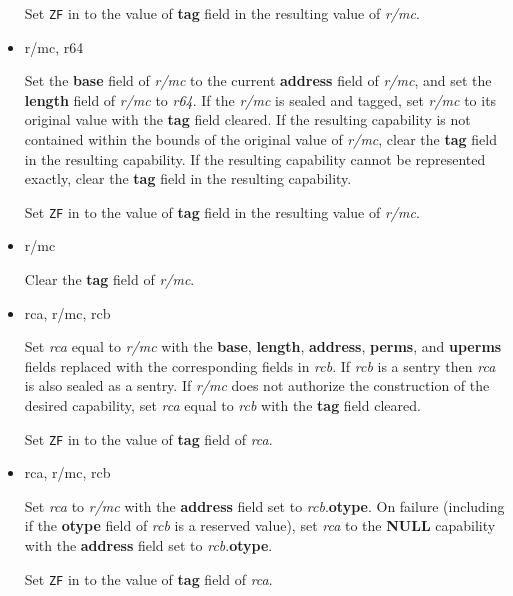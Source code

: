 \begin{itemize}
    Set \texttt{ZF} in \RFLAGS{} to the value of \textbf{tag} field
    in the resulting value of \emph{r/mc}.

  \item {} r/mc, r64

    Set the \textbf{base} field of \emph{r/mc} to the current
    \textbf{address} field of \emph{r/mc}, and set the \textbf{length}
    field of \emph{r/mc} to \emph{r64}.  If the \emph{r/mc} is sealed
    and tagged, set \emph{r/mc} to its original value with the
    \textbf{tag} field cleared.  If the resulting capability is not
    contained within the bounds of the original value of \emph{r/mc},
    clear the \textbf{tag} field in the resulting capability.  If the
    resulting capability cannot be represented exactly, clear the
    \textbf{tag} field in the resulting capability.

    Set \texttt{ZF} in \RFLAGS{} to the value of \textbf{tag} field
    in the resulting value of \emph{r/mc}.

  \item {} r/mc

    Clear the \textbf{tag} field of \emph{r/mc}.

  \item {} rca, r/mc, rcb

    Set \emph{rca} equal to \emph{r/mc} with the \textbf{base},
    \textbf{length}, \textbf{address}, \textbf{perms}, and
    \textbf{uperms} fields replaced with the corresponding fields in
    \emph{rcb}.  If \emph{rcb} is a sentry then \emph{rca} is also
    sealed as a sentry.  If \emph{r/mc} does not authorize the
    construction of the desired capability, set \emph{rca} equal to
    \emph{rcb} with the \textbf{tag} field cleared.

    Set \texttt{ZF} in \RFLAGS{} to the value of \textbf{tag} field
    of \emph{rca}.

  \item {} rca, r/mc, rcb

    Set \emph{rca} to \emph{r/mc} with the \textbf{address} field set
    to \emph{rcb}.\textbf{otype}.  On failure (including if the
    \textbf{otype} field of \emph{rcb} is a reserved value), set
    \emph{rca} to the \textbf{NULL} capability with the
    \textbf{address} field set to \emph{rcb}.\textbf{otype}.

    Set \texttt{ZF} in \RFLAGS{} to the value of \textbf{tag} field
    of \emph{rca}.


\end{itemize}
